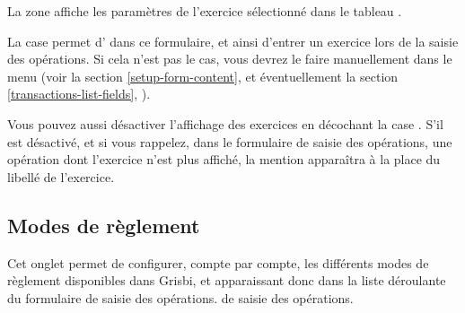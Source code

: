 La zone  affiche les paramètres de l'exercice sélectionné dans le tableau .

La case  permet d' dans ce formulaire, et ainsi d'entrer un exercice lors de la saisie des opérations. Si cela n'est pas le cas, vous devrez le faire manuellement dans le menu  (voir la section \vref{setup-form-content},  et éventuellement la section \vref{transactions-list-fields}, ).

Vous pouvez aussi désactiver l'affichage des exercices en décochant la case .
S'il est désactivé, et si vous rappelez, dans le formulaire de saisie des opérations, une opération dont l'exercice n'est plus affiché, la mention  apparaîtra à la place du libellé de l'exercice.


\subsection{Modes de règlement\label{setup-resources-modes}}

Cet onglet permet de configurer, compte par compte, les différents modes de règlement disponibles dans Grisbi, et apparaissant donc dans la liste déroulante du formulaire
\ifIllustration de saisie des opérations.
\else de saisie des opérations.
\fi

